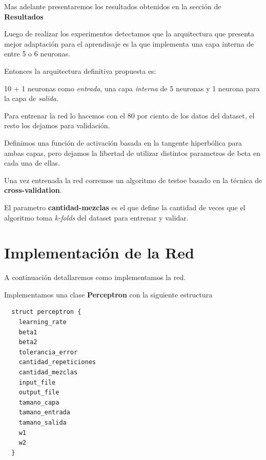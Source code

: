 \documentclass[onecolumn,10pt]{article}
\begin{document}
 Mas adelante presentaremos los resultados obtenidos en la sección de \textbf{Resultados}

 Luego de realizar los experimentos detectamos que la arquitectura que presenta
 mejor adaptación para el aprendisaje es la que implementa una capa interna de entre
 5 o 6 neuronas.

 Entonces la arquitectura definitiva propuesta es:

10 + 1 neuronas como \emph{entrada}, una capa \emph{interna} de 5 neuronas 
y 1 neurona para la capa de \emph{salida}.

Para entrenar la red lo hacemos con el 80 por ciento de los datos del dataset,
el resto los dejamos para validación.

Definimos una función de activación basada en la tangente hiperbólica para ambas
capas, pero dejamos la libertad de utilizar distintos parametros de beta en cada
una de ellas.

Una vez entrenada la red corremos un algoritmo de testoe basado en la técnica de
\textbf{cross-validation}.

El parametro \textbf{cantidad-mezclas} es el que define la cantidad de veces que
el algoritmo toma \emph{k-folds} del dataset para entrenar y validar.


\section{Implementación de la Red}

A continuación detallaremos como implementamos la red.

Implementamos una clase \textbf{Perceptron} con la siguiente estructura

\begin{lstlisting}
  struct perceptron {
    learning_rate 
    beta1 
    beta2
    tolerancia_error
    cantidad_repeticiones
    cantidad_mezclas
    input_file 
    output_file
    tamano_capa
    tamano_entrada
    tamano_salida 
    w1  
    w2  
  }

\end{lstlisting}
\end{document}
